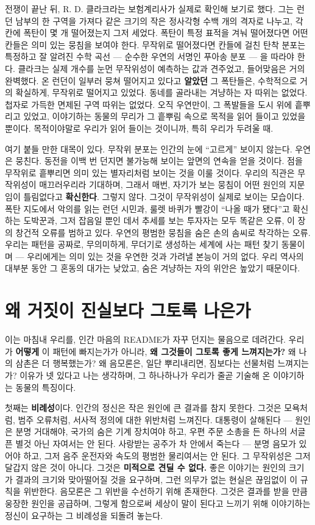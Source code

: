 전쟁이 끝난 뒤, R. D. 클라크라는 보험계리사가 실제로 확인해 보기로 했다. 그는 런던 남부의 한 구역을 가져다 같은 크기의 작은 정사각형 수백 개의 격자로 나누고, 각 칸에 폭탄이 몇 개 떨어졌는지 그저 세었다. 폭탄이 특정 표적을 겨눠 떨어졌다면 어떤 칸들은 의미 있는 뭉침을 보여야 한다. 무작위로 떨어졌다면 칸들에 걸친 탄착 분포는 특정하고 잘 알려진 수학 곡선 — 순수한 우연의 서명인 푸아송 분포 — 을 따라야 한다. 클라크는 실제 개수를 눈먼 무작위성이 예측하는 값과 견주었고, 들어맞음은 거의 완벽했다. 온 런던이 일부러 뭉쳐 떨어지고 있다고 \textbf{알았던} 그 폭탄들은, 수학적으로 거의 확실하게, 무작위로 떨어지고 있었다. 동네를 골라내는 겨냥하는 자 따위는 없었다. 첩자로 가득한 면제된 구역 따위는 없었다. 오직 우연만이, 그 폭발들을 도시 위에 흩뿌리고 있었고, 이야기하는 동물의 무리가 그 흩뿌림 속으로 목적을 읽어 들이고 있었을 뿐이다. 목적이야말로 우리가 읽어 들이는 것이니까, 특히 우리가 두려울 때.

여기 붙들 만한 대목이 있다. 무작위 분포는 인간의 눈에 ``고르게'' 보이지 않는다. 우연은 뭉친다. 동전을 이백 번 던지면 불가능해 보이는 앞면의 연속을 얻을 것이다. 점을 무작위로 흩뿌리면 의미 있는 별자리처럼 보이는 것을 이룰 것이다. 우리의 직관은 무작위성이 매끄러우리라 기대하며, 그래서 매번, 자기가 보는 뭉침이 어떤 원인의 지문임이 틀림없다고 \textbf{확신한다}. 그렇지 않다. 그것이 무작위성이 실제로 보이는 모습이다. 폭탄 지도에서 악의를 읽는 런던 시민과, 룰렛 바퀴가 빨강이 ``나올 때가 됐다''고 확신하는 도박꾼과, 그저 잡음일 뿐인 데서 추세를 보는 투자자는 모두 똑같은 오류, 이 장의 창건적 오류를 범하고 있다. 우연의 평범한 뭉침을 숨은 손의 솜씨로 착각하는 오류. 우리는 패턴을 공짜로, 무의미하게, 무더기로 생성하는 세계에 사는 패턴 찾기 동물이며 — 우리에게는 의미 있는 것을 우연한 것과 가려낼 본능이 거의 없다. 우리 역사의 대부분 동안 그 혼동의 대가는 낮았고, 숨은 겨냥하는 자의 위안은 높았기 때문이다.

\section*{왜 거짓이 진실보다 그토록 나은가}

이는 마침내 우리를, 인간 마음의 README가 자꾸 던지는 물음으로 데려간다. 우리가 \textbf{어떻게} 이 패턴에 빠지는가가 아니라, \textbf{왜 그것들이 그토록 좋게 느껴지는가?} 왜 나의 삼촌은 더 행복했는가? 왜 음모론은, 일단 뿌리내리면, 짐보다는 선물처럼 느껴지는가? 이유가 넷 있다고 나는 생각하며, 그 하나하나가 우리가 줄곧 기술해 온 이야기하는 동물의 특징이다.

첫째는 \textbf{비례성}이다. 인간의 정신은 작은 원인에 큰 결과를 참지 못한다. 그것은 모욕처럼, 범주 오류처럼, 서사적 정의에 대한 위반처럼 느껴진다. 대통령이 살해된다 — 원인은 분명 거대해야, 국가의 숨은 기계 장치여야 하고, 우편 주문 소총을 든 하나의 서글픈 별것 아닌 자여서는 안 된다. 사랑받는 공주가 차 안에서 죽는다 — 분명 음모가 있어야 하고, 그저 음주 운전자와 속도의 평범한 물리여서는 안 된다. 그 무작위성은 그저 달갑지 않은 것이 아니다. 그것은 \textbf{미적으로 견딜 수 없다.} 좋은 이야기는 원인의 크기가 결과의 크기와 맞아떨어질 것을 요구하며, 그런 의무가 없는 현실은 끊임없이 이 규칙을 위반한다. 음모론은 그 위반을 수선하기 위해 존재한다. 그것은 결과를 받을 만큼 웅장한 원인을 공급하며, 그렇게 함으로써 세상이 말이 된다고 느끼기 위해 이야기하는 정신이 요구하는 그 비례성을 되돌려 놓는다.


